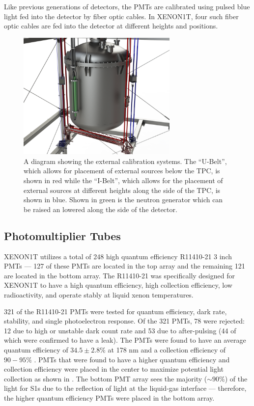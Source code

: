 Like previous generations of detectors, the PMTs are calibrated using pulsed blue light fed into the detector by fiber optic cables.  In XENON1T, four such fiber optic cables are fed into the detector at different heights and positions.


 \begin{figure}[t]
	\centering
	\includegraphics[width=0.7\textwidth]{xe1t_external_sources}
	\caption{A diagram showing the external calibration systems.  The ``U-Belt'', which allows for placement of external sources below the TPC, is shown in red while the ``I-Belt'', which allows for the placement of external sources at different heights along the side of the TPC, is shown in blue.  Shown in green is the neutron generator which can be raised an lowered along the side of the detector.}
	\label{fig:xe1t_external_sources}
\end{figure}
 
 
 \subsection{Photomultiplier Tubes}
 \label{sec:photomultiplier_tubes}
 
XENON1T utilizes a total of 248 high quantum efficiency  R11410-21 3 inch PMTs --- 127 of these PMTs are located in the top array and the remaining 121  are located in the bottom array.  The R11410-21 was specifically designed for XENON1T to have a high quantum efficiency, high collection efficiency, low radioactivity, and operate stably at liquid xenon temperatures.  

321 of the R11410-21 PMTs were tested for quantum efficiency, dark rate, stability, and single photoelectron response.  Of the 321 PMTs, 78 were rejected: 12 due to high or unstable dark count rate and 53 due to after-pulsing (44 of which were confirmed to have a leak).  The PMTs were found to have an average quantum efficiency of $34.5 \pm 2.8 \%$ at 178 nm and a collection efficiency of $90 - 95 \%$ \cite{barrow2017qualification}.  PMTs that were found to have a higher quantum efficiency and collection efficiency were placed in the center to maximize potential light collection as shown in .  The bottom PMT array sees the majority ($\sim 90\%$) of the light for S1s due to the reflection of light at the liquid-gas interface --- therefore, the higher quantum efficiency PMTs were placed in the bottom array.

